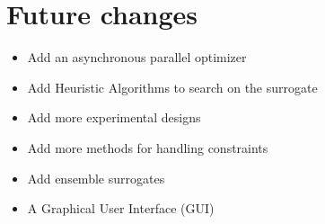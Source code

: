\documentclass[]{article}
\begin{document}
\section{Future changes}
\begin{itemize}
\item Add an asynchronous parallel optimizer
\item Add Heuristic Algorithms to search on the surrogate
\item Add more experimental designs
\item Add more methods for handling constraints
\item Add ensemble surrogates
\item A Graphical User Interface (GUI)
\end{itemize}
\end{document}
